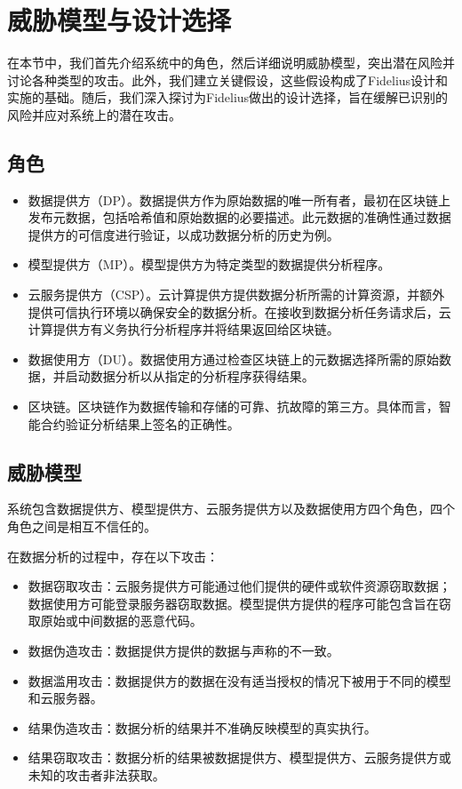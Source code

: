 \section{威胁模型与设计选择}

在本节中，我们首先介绍系统中的角色，然后详细说明威胁模型，突出潜在风险并讨论各种类型的攻击。此外，我们建立关键假设，这些假设构成了Fidelius设计和实施的基础。随后，我们深入探讨为Fidelius做出的设计选择，旨在缓解已识别的风险并应对系统上的潜在攻击。

\subsection{角色}
\begin{itemize}
    \item 数据提供方（DP）。数据提供方作为原始数据的唯一所有者，最初在区块链上发布元数据，包括哈希值和原始数据的必要描述。此元数据的准确性通过数据提供方的可信度进行验证，以成功数据分析的历史为例。
    \item 模型提供方（MP）。模型提供方为特定类型的数据提供分析程序。
    \item 云服务提供方（CSP）。云计算提供方提供数据分析所需的计算资源，并额外提供可信执行环境以确保安全的数据分析。在接收到数据分析任务请求后，云计算提供方有义务执行分析程序并将结果返回给区块链。
    \item 数据使用方（DU）。数据使用方通过检查区块链上的元数据选择所需的原始数据，并启动数据分析以从指定的分析程序获得结果。
    \item 区块链。区块链作为数据传输和存储的可靠、抗故障的第三方。具体而言，智能合约验证分析结果上签名的正确性。
\end{itemize}

\subsection{威胁模型}
系统包含数据提供方、模型提供方、云服务提供方以及数据使用方四个角色，四个角色之间是相互不信任的。

在数据分析的过程中，存在以下攻击：
\begin{itemize}
    \item 数据窃取攻击：云服务提供方可能通过他们提供的硬件或软件资源窃取数据；数据使用方可能登录服务器窃取数据。模型提供方提供的程序可能包含旨在窃取原始或中间数据的恶意代码。
    \item 数据伪造攻击：数据提供方提供的数据与声称的不一致。
    \item 数据滥用攻击：数据提供方的数据在没有适当授权的情况下被用于不同的模型和云服务器。
    \item 结果伪造攻击：数据分析的结果并不准确反映模型的真实执行。
    \item 结果窃取攻击：数据分析的结果被数据提供方、模型提供方、云服务提供方或未知的攻击者非法获取。
\end{itemize}

